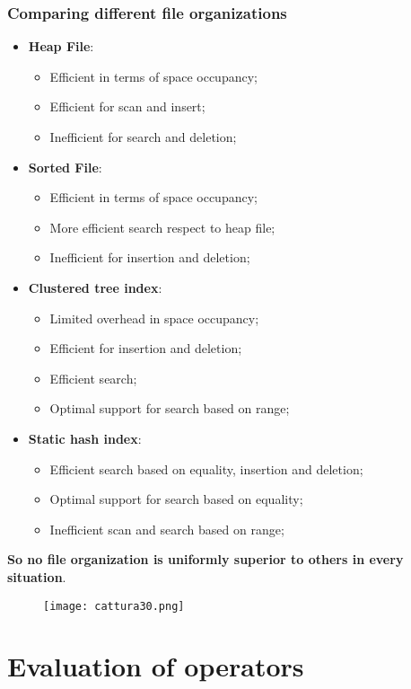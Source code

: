\documentclass{article}
\begin{document}
\subsubsection{Comparing different file organizations}
\begin{itemize}
\item \textbf{Heap File}:
\begin{itemize}
\item Efficient in terms of space occupancy;
\item Efficient for scan and insert;
\item Inefficient for search and deletion;
\end{itemize}
\item \textbf{Sorted File}:
\begin{itemize}
\item Efficient in terms of space occupancy;
\item More efficient search respect to heap file;
\item Inefficient for insertion and deletion;
\end{itemize}
\item \textbf{Clustered tree index}:
\begin{itemize}
\item Limited overhead in space occupancy;
\item Efficient for insertion and deletion;
\item Efficient search;
\item Optimal support for search based on range;
\end{itemize}
\item \textbf{Static hash index}:
\begin{itemize}
\item Efficient search based on equality, insertion and deletion;
\item Optimal support for search based on equality;
\item Inefficient scan and search based on range;
\end{itemize}
\end{itemize}
\textbf{So no file organization is uniformly superior to others in every situation}. 
\begin{figure}[H]
  \centering
  \texttt{[image: cattura30.png]}
\end{figure}
\clearpage
\section{Evaluation of operators}
\end{document}
